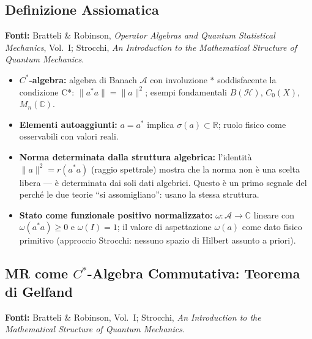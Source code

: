 \documentclass[12pt, a4paper]{article}
\newcommand{\fonti}[1]{%
	\begin{fontebox}
		\textcolor{fontecolor}{\footnotesize\textbf{Fonti:} #1}
	\end{fontebox}%
}
\begin{document}
	\subsection{Definizione Assiomatica}
	
	\fonti{Bratteli \& Robinson, \textit{Operator Algebras and Quantum Statistical
			Mechanics}, Vol.~I; Strocchi, \textit{An Introduction to the Mathematical
			Structure of Quantum Mechanics}.}
	
	\begin{itemize}
		\item \textbf{$C^*$-algebra:} algebra di Banach $\mathcal{A}$ con involuzione $*$
		soddisfacente la condizione C*: $\|a^*a\| = \|a\|^2$; esempi fondamentali
		$B(\mathcal{H})$, $C_0(X)$, $M_n(\mathbb{C})$.
		\item \textbf{Elementi autoaggiunti:} $a = a^*$ implica $\sigma(a) \subset \mathbb{R}$;
		ruolo fisico come osservabili con valori reali.
		\item \textbf{Norma determinata dalla struttura algebrica:} l'identità
		$\|a\|^2 = r(a^*a)$ (raggio spettrale) mostra che la norma non è una scelta
		libera --- è determinata dai soli dati algebrici. Questo è un primo segnale
		del perché le due teorie ``si assomigliano'': usano la stessa struttura.
		\item \textbf{Stato come funzionale positivo normalizzato:} $\omega: \mathcal{A}
		\to \mathbb{C}$ lineare con $\omega(a^*a) \geq 0$ e $\omega(I) = 1$; il valore
		di aspettazione $\omega(a)$ come dato fisico primitivo (approccio Strocchi:
		nessuno spazio di Hilbert assunto a priori).
	\end{itemize}
	
	\subsection{MR come $C^*$-Algebra Commutativa: Teorema di Gelfand}
	
	\fonti{Bratteli \& Robinson, Vol.~I; Strocchi, \textit{An Introduction to the
			Mathematical Structure of Quantum Mechanics}.}
	
\end{document}

